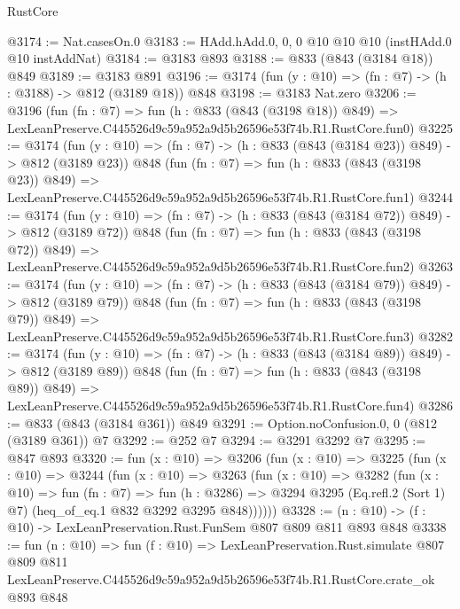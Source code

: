 \begin{lexlean}{RustCore}
\begin{coremodule}
@3174 := Nat.casesOn.{0}
@3183 := HAdd.hAdd.{0, 0, 0} @10 @10 @10 (instHAdd.{0} @10 instAddNat)
@3184 := @3183 @893
@3188 := @833 (@843 (@3184 @18)) @849
@3189 := @3183 @891
@3196 := @3174 (fun (y : @10) => (fn : @7) -> (h : @3188) -> @812 (@3189 @18)) @848
@3198 := @3183 Nat.zero
@3206 := @3196
    (fun (fn : @7) =>
    fun (h : @833 (@843 (@3198 @18)) @849) =>
    LexLeanPreserve.C445526d9c59a952a9d5b26596e53f74b.R1.RustCore.fun0)
@3225 := @3174
    (fun (y : @10) => (fn : @7) -> (h : @833 (@843 (@3184 @23)) @849) -> @812 (@3189 @23))
    @848
    (fun (fn : @7) =>
    fun (h : @833 (@843 (@3198 @23)) @849) =>
    LexLeanPreserve.C445526d9c59a952a9d5b26596e53f74b.R1.RustCore.fun1)
@3244 := @3174
    (fun (y : @10) => (fn : @7) -> (h : @833 (@843 (@3184 @72)) @849) -> @812 (@3189 @72))
    @848
    (fun (fn : @7) =>
    fun (h : @833 (@843 (@3198 @72)) @849) =>
    LexLeanPreserve.C445526d9c59a952a9d5b26596e53f74b.R1.RustCore.fun2)
@3263 := @3174
    (fun (y : @10) => (fn : @7) -> (h : @833 (@843 (@3184 @79)) @849) -> @812 (@3189 @79))
    @848
    (fun (fn : @7) =>
    fun (h : @833 (@843 (@3198 @79)) @849) =>
    LexLeanPreserve.C445526d9c59a952a9d5b26596e53f74b.R1.RustCore.fun3)
@3282 := @3174
    (fun (y : @10) => (fn : @7) -> (h : @833 (@843 (@3184 @89)) @849) -> @812 (@3189 @89))
    @848
    (fun (fn : @7) =>
    fun (h : @833 (@843 (@3198 @89)) @849) =>
    LexLeanPreserve.C445526d9c59a952a9d5b26596e53f74b.R1.RustCore.fun4)
@3286 := @833 (@843 (@3184 @361)) @849
@3291 := Option.noConfusion.{0, 0} (@812 (@3189 @361)) @7
@3292 := @252 @7
@3294 := @3291 @3292 @7
@3295 := @847 @893
@3320 := fun (x : @10) =>
  @3206
    (fun (x : @10) =>
    @3225
      (fun (x : @10) =>
      @3244
        (fun (x : @10) =>
        @3263
          (fun (x : @10) =>
          @3282
            (fun (x : @10) =>
            fun (fn : @7) =>
            fun (h : @3286) =>
            @3294 @3295 (Eq.refl.{2} (Sort 1) @7) (heq_of_eq.{1} @832 @3292 @3295 @848))))))
@3328 := (n : @10) -> (f : @10) -> LexLeanPreservation.Rust.FunSem @807 @809 @811 @893 @848
@3338 := fun (n : @10) =>
  fun (f : @10) =>
  LexLeanPreservation.Rust.simulate
    @807
    @809
    @811
    LexLeanPreserve.C445526d9c59a952a9d5b26596e53f74b.R1.RustCore.crate_ok
    @893
    @848
\end{coremodule}
\end{lexlean}
